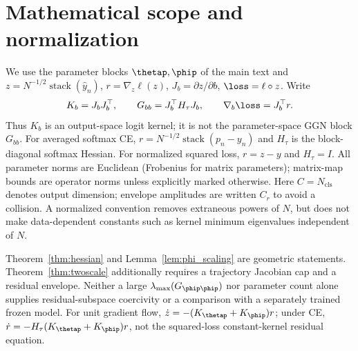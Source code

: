 
\section{Mathematical scope and normalization}
\label{sec:astra_math}
We use the parameter blocks $\thetap,\phip$ of the main text and
$z=N^{-1/2}\operatorname{stack}(\hat y_n)$, $r=\nabla_z\ell(z)$,
$J_b=\partial z/\partial b$, $\loss=\ell\circ z$. Write
\[
 K_b=J_bJ_b^\top,\qquad G_{bb}=J_b^\top H_\tau J_b,
 \qquad \nabla_b\loss=J_b^\top r.
\]
Thus $K_b$ is an output-space logit kernel; it is not the parameter-space
GGN block $G_{bb}$. For averaged softmax CE,
$r=N^{-1/2}\operatorname{stack}(p_n-y_n)$ and $H_\tau$ is the block-diagonal
softmax Hessian. For normalized squared loss, $r=z-y$ and $H_\tau=I$.
All parameter norms are Euclidean (Frobenius for matrix parameters);
matrix-map bounds are operator norms unless explicitly marked otherwise.
Here $C=N_{\mathrm{cls}}$ denotes output dimension; envelope amplitudes
are written $C_r$ to avoid a collision. A normalized convention removes
extraneous powers of $N$, but does not make data-dependent constants
such as kernel minimum eigenvalues independent of $N$.

Theorem~\ref{thm:hessian} and Lemma~\ref{lem:phi_scaling} are geometric
statements. Theorem~\ref{thm:twoscale} additionally requires a trajectory
Jacobian cap and a residual envelope. Neither a large
$\lambda_{\max}(G_{\phip\phip})$ nor parameter count alone supplies
residual-subspace coercivity or a comparison with a separately trained
frozen model. For unit gradient flow, $\dot z=-(K_\thetap+K_\phip)r$;
under CE, $\dot r=-H_\tau(K_\thetap+K_\phip)r$, not the squared-loss
constant-kernel residual equation.


